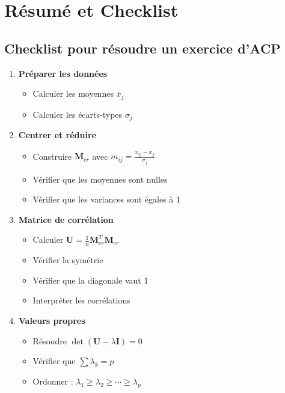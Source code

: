 \documentclass[11pt,a4paper]{article}
\begin{document}
\newpage

\section{Résumé et Checklist}

\subsection{Checklist pour résoudre un exercice d'ACP}

\begin{enumerate}
    \item[$\square$] \textbf{Préparer les données}
    \begin{itemize}
        \item Calculer les moyennes $\bar{x}_j$
        \item Calculer les écarts-types $\sigma_j$
    \end{itemize}
    
    \item[$\square$] \textbf{Centrer et réduire}
    \begin{itemize}
        \item Construire $\mathbf{M}_{cr}$ avec $m_{ij} = \frac{x_{ij} - \bar{x}_j}{\sigma_j}$
        \item Vérifier que les moyennes sont nulles
        \item Vérifier que les variances sont égales à 1
    \end{itemize}
    
    \item[$\square$] \textbf{Matrice de corrélation}
    \begin{itemize}
        \item Calculer $\mathbf{U} = \frac{1}{n}\mathbf{M}_{cr}^T\mathbf{M}_{cr}$
        \item Vérifier la symétrie
        \item Vérifier que la diagonale vaut 1
        \item Interpréter les corrélations
    \end{itemize}
    
    \item[$\square$] \textbf{Valeurs propres}
    \begin{itemize}
        \item Résoudre $\det(\mathbf{U} - \lambda\mathbf{I}) = 0$
        \item Vérifier que $\sum \lambda_k = p$
        \item Ordonner : $\lambda_1 \geq \lambda_2 \geq \cdots \geq \lambda_p$
    \end{itemize}
    

\end{enumerate}
\end{document}
